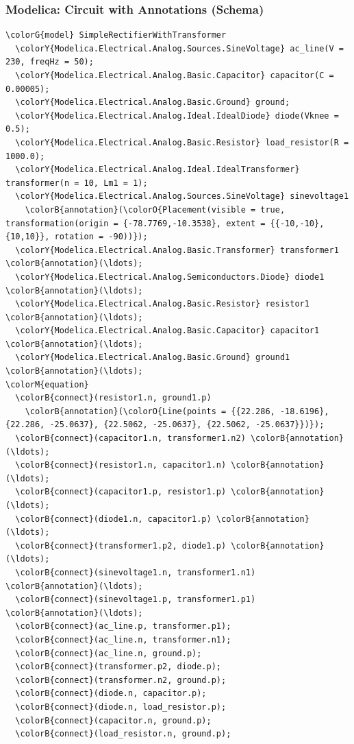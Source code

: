 \begin{frame}[fragile]
  \frametitle{Modelica: Circuit with Annotations (Schema)}
  \fontsize{5pt}{5pt}\selectfont
\begin{Verbatim}[commandchars=\\\{\}]
\colorG{model} SimpleRectifierWithTransformer
  \colorY{Modelica.Electrical.Analog.Sources.SineVoltage} ac_line(V = 230, freqHz = 50);
  \colorY{Modelica.Electrical.Analog.Basic.Capacitor} capacitor(C = 0.00005);
  \colorY{Modelica.Electrical.Analog.Basic.Ground} ground;
  \colorY{Modelica.Electrical.Analog.Ideal.IdealDiode} diode(Vknee = 0.5);
  \colorY{Modelica.Electrical.Analog.Basic.Resistor} load_resistor(R = 1000.0);
  \colorY{Modelica.Electrical.Analog.Ideal.IdealTransformer} transformer(n = 10, Lm1 = 1);
  \colorY{Modelica.Electrical.Analog.Sources.SineVoltage} sinevoltage1
    \colorB{annotation}(\colorO{Placement(visible = true, transformation(origin = {-78.7769,-10.3538}, extent = {{-10,-10},{10,10}}, rotation = -90))});
  \colorY{Modelica.Electrical.Analog.Basic.Transformer} transformer1 \colorB{annotation}(\ldots);
  \colorY{Modelica.Electrical.Analog.Semiconductors.Diode} diode1 \colorB{annotation}(\ldots);
  \colorY{Modelica.Electrical.Analog.Basic.Resistor} resistor1 \colorB{annotation}(\ldots);
  \colorY{Modelica.Electrical.Analog.Basic.Capacitor} capacitor1 \colorB{annotation}(\ldots);
  \colorY{Modelica.Electrical.Analog.Basic.Ground} ground1 \colorB{annotation}(\ldots);
\colorM{equation}
  \colorB{connect}(resistor1.n, ground1.p)
    \colorB{annotation}(\colorO{Line(points = {{22.286, -18.6196}, {22.286, -25.0637}, {22.5062, -25.0637}, {22.5062, -25.0637}})});
  \colorB{connect}(capacitor1.n, transformer1.n2) \colorB{annotation}(\ldots);
  \colorB{connect}(resistor1.n, capacitor1.n) \colorB{annotation}(\ldots);
  \colorB{connect}(capacitor1.p, resistor1.p) \colorB{annotation}(\ldots);
  \colorB{connect}(diode1.n, capacitor1.p) \colorB{annotation}(\ldots);
  \colorB{connect}(transformer1.p2, diode1.p) \colorB{annotation}(\ldots);
  \colorB{connect}(sinevoltage1.n, transformer1.n1) \colorB{annotation}(\ldots);
  \colorB{connect}(sinevoltage1.p, transformer1.p1) \colorB{annotation}(\ldots);
  \colorB{connect}(ac_line.p, transformer.p1);
  \colorB{connect}(ac_line.n, transformer.n1);
  \colorB{connect}(ac_line.n, ground.p);
  \colorB{connect}(transformer.p2, diode.p);
  \colorB{connect}(transformer.n2, ground.p);
  \colorB{connect}(diode.n, capacitor.p);
  \colorB{connect}(diode.n, load_resistor.p);
  \colorB{connect}(capacitor.n, ground.p);
  \colorB{connect}(load_resistor.n, ground.p);

\end{Verbatim}
\end{frame}
